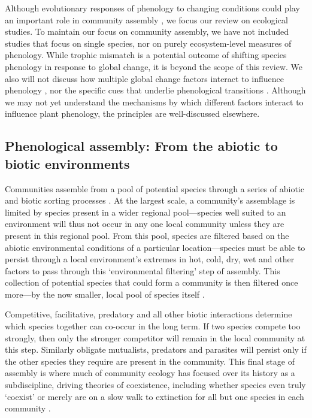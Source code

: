 \documentclass[11pt]{article}
\begin{document}
Although evolutionary responses of phenology to changing conditions could play an important role in community assembly \citep[e.g.][]{cavender2019diversification}, we focus our review on ecological studies. To maintain our focus on community assembly, we have not included studies that focus on single species, nor on purely ecosystem-level measures of phenology. While trophic mismatch \citep{kharouba2018global} is a potential outcome of shifting species phenology in response to global change, it is beyond the scope of this review. We also will not discuss how multiple global change factors interact to influence phenology \citep[e.g.][]{zhou2023climate}, nor the specific cues that underlie phenological transitions \citep[e.g.][]{chuine2017process}. Although we may not yet understand the mechanisms by which different factors interact to influence plant phenology, the principles are well-discussed elsewhere.

\subsection*{Phenological assembly: From the abiotic to biotic environments} %

Communities assemble from a pool of potential species through a series of abiotic and biotic sorting processes \citep{hillerislambers2012rethinking}. At the largest scale, a community's assemblage is limited by species present in a wider regional pool---species well suited to an environment will thus not occur in any one local community unless they are present in this regional pool. From this pool, species are filtered based on the abiotic environmental conditions of a particular location---species must be able to persist through a local environment's extremes in hot, cold, dry, wet and other factors to pass through this `environmental filtering' step of assembly. This collection of potential species that could form a community is then filtered once more---by the now smaller, local pool of species itself \citep{hillerislambers2012rethinking}. 

Competitive, facilitative, predatory and all other biotic interactions determine which species together can co-occur in the long term. If two species compete too strongly, then only the stronger competitor will remain in the local community at this step. Similarly obligate mutualists, predators and parasites will persist only if the other species they require are present in the community. This final stage of assembly is where much of community ecology has focused over its history as a subdiscipline, driving theories of coexistence, including whether species even truly `coexist' or merely are on a slow walk to extinction for all but one species in each community \citep{Hubbell:2001vo}. 
\end{document}
